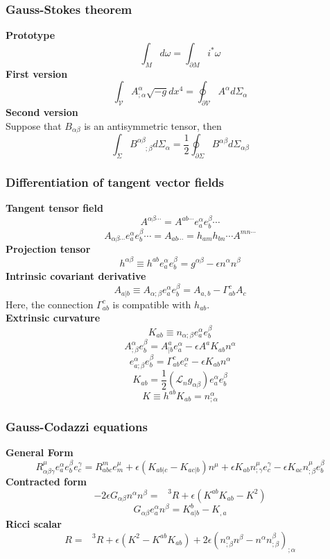 \documentclass{article}
\begin{document}
\subsubsection{Gauss-Stokes theorem}
\textbf{Prototype}
\[\int_{M} d\omega = \int_{\partial M} i^* \omega\]
\textbf{First version}
\[\int_{\mathcal{V}} A^{\alpha}_{;\alpha} \sqrt{-g} dx^4 = \oint_{\partial \mathcal{V}} A^{\alpha} d\Sigma_{\alpha}\]
\textbf{Second version}\\
Suppose that $B_{\alpha \beta}$ is an antisymmetric tensor, then
\[\int_{\Sigma} B^{\alpha \beta}_{\phantom{\alpha \beta};\beta} d\Sigma_{\alpha} = \frac{1}{2}\oint_{\partial \Sigma} B^{\alpha \beta} d\Sigma_{\alpha \beta}\]

\subsubsection{Differentiation of tangent vector fields}
\textbf{Tangent tensor field}
\[A^{\alpha \beta \cdots} = A^{ab\cdots} e_a^{\alpha} e_b^{\beta} \cdots\]
\[A_{\alpha \beta \cdots} e_a^{\alpha} e_b^{\beta} \cdots = A_{ab\cdots} = h_{am} h_{bn} \cdots A^{mn\cdots}\]
\textbf{Projection tensor}
\[h^{\alpha \beta} \equiv h^{ab}e_a^{\alpha} e_b^{\beta} = g^{\alpha \beta} - \epsilon n^{\alpha} n^{\beta}\]
\textbf{Intrinsic covariant derivative}
\[A_{a|b} \equiv A_{\alpha;\beta} e_a^{\alpha} e_b^{\beta} = A_{a,b} - \Gamma^c_{ab}A_c\]
Here, the connection $\Gamma^c_{ab}$ is compatible with $h_{ab}$.\\
\textbf{Extrinsic curvature}
\[K_{ab} \equiv n_{\alpha;\beta}e_a^{\alpha} e_b^{\beta}\]
\[A^{\alpha}_{;\beta} e_b^{\beta} = A^a_{|b} e_a^{\alpha} - \epsilon A^a K_{ab}n^{\alpha}\]
\[e^{\alpha}_{a;\beta} e_b^{\beta} = \Gamma^c_{ab}e_c^{\alpha} - \epsilon K_{ab}n^{\alpha}\]
\[K_{ab} = \frac{1}{2}(\mathcal{L}_n g_{\alpha \beta})e_a^{\alpha} e_b^{\beta}\]
\[K \equiv h^{ab}K_{ab} = n^{\alpha}_{;\alpha}\]

\subsubsection{Gauss-Codazzi equations}
\textbf{General Form}
\[R^{\mu}_{\alpha \beta \gamma} e_a^{\alpha} e_b^{\beta} e_c^{\gamma} = R^m_{abc} e_m^{\mu} + \epsilon (K_{ab|c} - K_{ac|b})n^{\mu} + \epsilon K_{ab} n^{\mu}_{;\gamma}e_c^{\gamma} - \epsilon K_{ac} n^{\mu}_{;\beta}e_b^{\beta}\]
\textbf{Contracted form}
\[-2\epsilon G_{\alpha \beta} n^{\alpha} n^{\beta} = \phantom{R}^3R + \epsilon(K^{ab}K_{ab}-K^2)\]
\[G_{\alpha \beta} e_a^{\alpha}n^{\beta} = K^b_{a|b} - K_{,a}\]
\textbf{Ricci scalar}
\[R = \phantom{R}^3R + \epsilon(K^2-K^{ab}K_{ab}) + 2\epsilon(n^{\alpha}_{;\beta}n^{\beta}-n^{\alpha}n^{\beta}_{;\beta})_{;\alpha}\]
\end{document}
